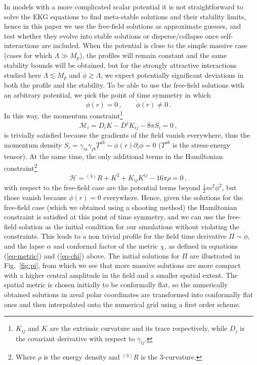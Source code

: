 \documentclass[11pt,a4paper]{article}
\begin{document}
In models with a more complicated scalar potential it is not straightforward to solve the EKG equations to find meta-stable solutions and their stability limits, hence in this paper we use the free-field solutions as approximate guesses, and test whether they evolve into stable solutions or disperse/collapse once self-interactions are included. When the potential is close to the simple massive case (cases for which $\Lambda \gg M_p$), the profiles will remain constant and the same stability bounds will be obtained, but for the strongly attractive interactions studied here $\Lambda \lesssim M_p$ and $\phi \gtrsim \Lambda$, we expect potentially significant deviations in both the profile and the stability.
To be able to use the free-field solutions with an arbitrary potential, we pick the point of time symmetry in which
\begin{equation}
\phi(r) = 0 \,, \qquad \dot\phi(r) \neq 0 \,.
\end{equation}
In this way, the momentum constraint\footnote{$K_{ij}$ and $K$ are the extrinsic curvature and its trace respectively, while $D_j$ is the covariant derivative with respect to $\gamma_{ij}$.}
\begin{equation}
\mathcal{M}_i = D_i K - D^j K_{ij} - 8 \pi S_i = 0 \,,
\end{equation}
is trivially satisfied because the gradients of the field vanish everywhere, thus the momentum density $S_i = \gamma_{ia} \gamma_{jb} T^{ab} \sim \dot\phi(r) \partial_i \phi = 0$ ($T^{ab}$ is the stress-energy tensor). At the same time, the only additional terms in the Hamiltonian constraint\footnote{Where $\rho$ is the energy density and ${}^{(3)} R$ is the $3$-curvature.}
\begin{equation}
\mathcal{H} = {}^{(3)} R + K^2 + K_{ij} K^{ij} - 16 \pi \rho = 0 \,, \label{eqn-Ham}
\end{equation}
with respect to the free-field case are the potential terms beyond $\frac{1}{2} m^2 \phi^2$, but those vanish because $\phi(r) = 0$ everywhere. Hence, given the solutions for the free-field case (which we obtained using a shooting method) the Hamiltonian constraint is satisfied at this point of time symmetry, and we can use the free-field solution as the initial condition for our simulations without violating the constraints. This leads to a non trivial profile for the field time derivative $\Pi \sim \dot \phi$, and the lapse $\alpha$ and conformal factor of the metric $\chi$, as defined in equations (\ref{eq-metric}) and (\ref{eq-chi}) above. The initial solutions for $\Pi$ are illustrated in Fig.~\ref{fig:pi}, from which we see that more massive solutions are more compact with a higher central amplitude in the field and a smaller spatial extent. The spatial metric is chosen initially to be conformally flat, so the numerically obtained solutions in areal polar coordinates are transformed into conformally flat ones and then interpolated onto the numerical grid using a first order scheme. 
\end{document}
